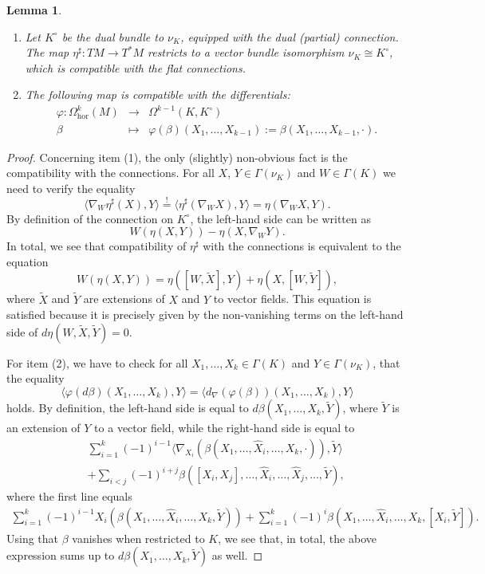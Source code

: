 \documentclass[11pt,thmsa]{amsart}
\newtheorem{lemma}[theorem]{Lemma}
\theoremstyle{definition}
\newcommand{\hor}{\mathrm{hor}}
\begin{document}
\begin{lemma}
\begin{enumerate}
\item Let $K^\circ$ be the dual bundle to $\nu_K$, equipped with the dual (partial) connection. The map $\eta^\sharp: TM \to T^*M$ restricts to a vector bundle isomorphism $\nu_K \cong K^\circ$, which is compatible with the flat connections.
\item The following map is compatible with the differentials:
\begin{eqnarray*}
\varphi: \Omega_\hor^k(M) &\to & \Omega^{k-1}(K,K^\circ)\\
\beta &\mapsto & \varphi(\beta)(X_1,\dots,X_{k-1}):=\beta(X_1,\dots, X_{k-1},\cdot).
\end{eqnarray*}
\end{enumerate}
\end{lemma} 

\begin{proof}

Concerning item (1), the only (slightly) non-obvious fact is the compatibility with the connections. For all $X$, $Y \in \Gamma(\nu_K)$ and $W\in \Gamma(K)$ we need to verify the equality
$$ \langle\nabla_W \eta^\sharp(X), Y\rangle \overset{!}{=} \langle\eta^\sharp(\nabla_W X),Y\rangle = \eta(\nabla_W X,Y).$$
By definition of the connection on $K^\circ$, the left-hand side can be written as
$$ W(\eta(X,Y)) - \eta(X,\nabla_W Y).$$
In total, we see that compatibility of $\eta^\sharp$ with the connections is equivalent to the equation
$$ W(\eta(X,Y)) = \eta([W,\tilde{X}],Y) + \eta(X,[W,\tilde{Y}]),$$
where $\tilde{X}$ and $\tilde{Y}$ are extensions of $X$ and $Y$ to vector fields.
This equation is satisfied because it is precisely given by the non-vanishing terms on the left-hand side of $d\eta(W,\tilde{X},\tilde{Y})=0$. 

For item (2), we have to check for all $X_1,\dots, X_k \in \Gamma(K)$
and $Y \in \Gamma(\nu_K)$, that the equality
$$ \langle\varphi(d\beta)(X_1,\dots,X_k),Y\rangle = \langle d_\nabla(\varphi(\beta))(X_1,\dots,X_k),Y\rangle$$
holds.
By definition, the left-hand side is equal to
$ d\beta(X_1,\dots,X_k,\tilde{Y})$, where $\tilde{Y}$ is an extension of $Y$ to a vector field, while the right-hand side is equal to 
\begin{eqnarray*}
 &&\sum_{i=1}^k(-1)^{i-1} \langle\nabla_{X_i}(\beta(X_1,\dots,\hat{X}_i,\dots,X_k,\cdot)),\tilde{Y}\rangle \\
 &&+ \sum_{i<j}(-1)^{i+j}\beta([X_i,X_j],\dots,\hat{X}_i,\dots,\hat{X}_j,\dots,\tilde{Y}),
 \end{eqnarray*}
where the first line equals
\begin{eqnarray*}
\sum_{i=1}^k(-1)^{i-1}X_i(\beta(X_1,\dots,\hat{X}_i,\dots,X_k,\tilde{Y}))
 + \sum_{i=1}^k (-1)^i \beta(X_1,\dots,\hat{X}_i,\dots,X_k,[X_i,\tilde{Y}]).
\end{eqnarray*}
Using that $\beta$ vanishes when restricted to $K$, we see that, in total, the above expression sums up to
$ d\beta(X_1,\dots,X_k,\tilde{Y})$ as well.
 \end{proof}
 
\end{document}
